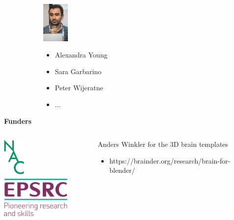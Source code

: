 \documentclass[10pt,xcolor=table,aspectratio=169]{beamer}
\begin{document}
\begin{frame}
\begin{figure}
\begin{subfigure}{0.2\textwidth}
\includegraphics[height=2cm]{images/arman} 
\end{subfigure}
\begin{subfigure}{0.2\textwidth}
 \begin{itemize}
  \item Alexandra Young
  \item Sara Garbarino
  \item Peter Wijeratne
  \item ...
 \end{itemize}
\end{subfigure}



\end{figure}



\vspace{1em}

\textbf{Funders}\\
\begin{columns}
\begin{column}{0.4\textwidth}

\vspace{1em}

\includegraphics[height=2cm]{images/nac_logo} \hspace{2em}
\includegraphics[height=2cm]{images/epsrc_logo}
\end{column}
\begin{column}{0.4\textwidth}
Anders Winkler for the 3D brain templates\\
 \begin{itemize}
  \item https://brainder.org/research/brain-for-blender/
 \end{itemize}

\end{column}

\end{columns}
 

 

  
\end{frame}


\end{document}
